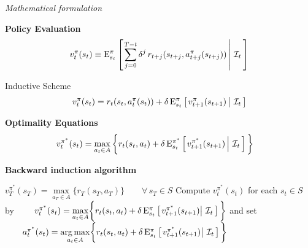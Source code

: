 \begin{frame}\begin{center}
		\LARGE\textit{Mathematical formulation}
\end{center}\end{frame}
\begin{frame}
\textbf{Policy Evaluation}\vspace{0.3cm}
\begin{align*}
  v^\pi_t(s_t) \equiv \mathrm{E}_{s_t}^\pi\left[\left.\sum^{T - t}_{j = 0}  \delta^j\, r_{t + j}(s_{t + j}, a^\pi_{t + j}(s_{t + j})) \,\right\vert\,\mathcal{I}_t\,\right]\\
\end{align*}

Inductive Scheme
\begin{align*}
v^\pi_t(s_t) = r_t(s_t,  a^\pi_t(s_t)) + \delta\,\mathrm{E}^\pi_{s_t} \left[\left.v^\pi_{t + 1}(s_{t + 1})  \,\right\vert\,\mathcal{I}_t\,\right]
\end{align*}
\end{frame}
\begin{frame}
\textbf{Optimality Equations}\vspace{0.3cm}
\begin{align*}\label{MPD Optimality}
v^{\pi^*}_t(s_t)  & = \max_{a_t \in A}\bigg\{ r_t(s_t, a_t) + \delta\, \mathrm{E}^{\pi^*}_{s_t} \left[\left.v^{\pi^*}_{t + 1}(s_{t + 1})\,\right\vert\,\mathcal{I}_t\,\right] \bigg\}
\end{align*}
\end{frame}
\begin{frame}\textbf{Backward induction algorithm}\vspace{0.5cm}

\begin{algorithmic}\small
{}
        \State $v^{\pi^*}_T(s_T) =  \underset{a_T\in A}{\max} \bigg\{ r_T(s_T, a_T) \bigg\}\qquad \forall\, s_T\in S$
    \Else
        \State Compute $v^{\pi^*}_t(s_t)$ for each $s_t\in S$ by
        \State $\qquad v^{\pi^*}_t(s_t) = \underset{a_t\in A}{\max} \bigg\{ r_t(s_t, a_t) + \delta\,\mathrm{E}^\pi_{s_t} \left[\left.v^{\pi^*}_{t + 1}(s_{t + 1})\right\vert\,\mathcal{I}_t\,\right] \bigg\}$
        \State and set
        \State $\qquad a^{\pi^*}_t(s_t) = \underset{a_t\in A}{\operatorname*{arg\,max}} \bigg\{ r_t(s_t, a_t) + \delta\,\mathrm{E}^\pi_{s_t} \left[\left.v^{\pi^*}_{t + 1}(s_{t + 1})\right\vert\,\mathcal{I}_t\,\right] \bigg\}$
    \EndIf
\EndFor
\vspace{0.3cm}\end{algorithmic}
\end{frame}
